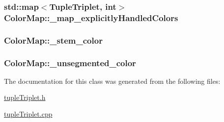 \hypertarget{classColorMap_aaf7f6a19620ab4f9bccfc842ccee1a14}{
\subsubsection[{\-\_\-map\-\_\-explicitly\-Handled\-Colors}]{\setlength{\rightskip}{0pt plus 5cm}std\-::map$<${\bf Tuple\-Triplet}, int$>$ Color\-Map\-::\-\_\-map\-\_\-explicitly\-Handled\-Colors}}\label{classColorMap_aaf7f6a19620ab4f9bccfc842ccee1a14}
\hypertarget{classColorMap_a92b0918914c5748a554c839e4e3c18f7}{
\subsubsection[{\-\_\-stem\-\_\-color}]{ Color\-Map\-::\-\_\-stem\-\_\-color}}\label{classColorMap_a92b0918914c5748a554c839e4e3c18f7}
\hypertarget{classColorMap_a17a0591add2cec4e5c9d266ade02213c}{
\subsubsection[{\-\_\-unsegmented\-\_\-color}]{ Color\-Map\-::\-\_\-unsegmented\-\_\-color}}\label{classColorMap_a17a0591add2cec4e5c9d266ade02213c}


The documentation for this class was generated from the following files\-:\begin{DoxyCompactItemize}
\item 
\hyperlink{tupleTriplet_8h}{tuple\-Triplet.\-h}\item 
\hyperlink{tupleTriplet_8cpp}{tuple\-Triplet.\-cpp}\end{DoxyCompactItemize}
